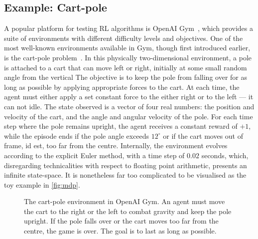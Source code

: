 \subsection{Example: Cart-pole}
\label{sec:cartpole}
A popular platform for testing RL algorithms is OpenAI Gym~\autocite{gym}, which provides a suite of environments with different difficulty levels and objectives.
One of the most well-known environments available in Gym, though first introduced earlier, is the cart-pole problem~\autocite{barto1983}.
In this physically two-dimensional environment, a pole is attached to a cart that can move left or right, initially at some small random angle from the vertical
The objective is to keep the pole from falling over for as long as possible by applying appropriate forces to the cart.
At each time, the agent must either apply a set constant force to the either right or to the left — it can not idle.
The state observed is a vector of four real numbers: the position and velocity of the cart, and the angle and angular velocity of the pole.
For each time step where the pole remains upright, the agent receives a constant reward of $+1$, while the episode ends if the pole angle exceeds $12^\circ$ or if the cart moves out of frame, id est, too far from the centre.
Internally, the environment evolves according to the explicit Euler method, with a time step of $0.02$ seconds\footnotemark, which, disregarding technicalities with respect to floating point arithmetic, presents an infinite state-space.
It is nonetheless far too complicated to be visualised as the toy example in \cref{fig:mdp}.


\begin{figure}
    \centering
    \caption[
        The cart-pole environment in OpenAI Gym.
    ]{
        The cart-pole environment in OpenAI Gym.
        An agent must move the cart to the right or the left to combat gravity and keep the pole upright.
        If the pole falls over or the cart moves too far from the centre, the game is over.
        The goal is to last as long as possible.
    }
    \label{fig:cartpole}
\end{figure}

